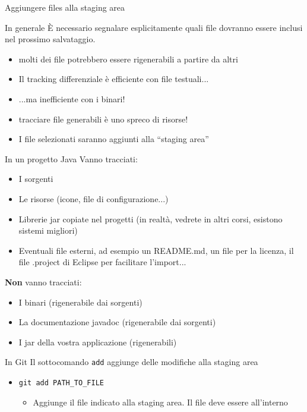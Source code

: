 \documentclass[presentation]{beamer}
\begin{document}
\begin{frame}{Aggiungere files alla staging area}
	\begin{block}{In generale}	
		È necessario segnalare esplicitamente quali file dovranno essere inclusi nel prossimo 
salvataggio.
		\begin{itemize}
			\item molti dei file potrebbero essere rigenerabili a partire da altri
			\item Il tracking differenziale è efficiente con file testuali...
			\item ...ma inefficiente con i binari!
			\item tracciare file generabili è uno spreco di risorse!
			\item I file selezionati saranno aggiunti alla ``staging area''
		\end{itemize}
	\end{block}
	\begin{block}{In un progetto Java}	
		Vanno tracciati:
		\begin{itemize}
			\item I sorgenti
			\item Le risorse (icone, file di configurazione...)
			\item Librerie jar copiate nel progetti (in realtà, vedrete in altri corsi, esistono 
sistemi migliori)
			\item Eventuali file esterni, ad esempio un README.md, un file per la licenza, il file 
.project di Eclipse per facilitare l'import...
		\end{itemize}
		\textbf{Non} vanno tracciati:
		\begin{itemize}
			\item I binari (rigenerabile dai sorgenti)
			\item La documentazione javadoc (rigenerabile dai sorgenti)
			\item I jar della vostra applicazione (rigenerabili)
		\end{itemize}
	\end{block}
	\begin{block}{In Git}
		Il sottocomando \texttt{add} aggiunge delle modifiche alla staging area
		\begin{itemize}
			\item \texttt{git add PATH\_TO\_FILE}
			\begin{itemize}
				\item Aggiunge il file indicato alla staging area. Il file deve essere all'interno 

\end{itemize}
\end{itemize}
\end{block}
\end{frame}
\end{document}
